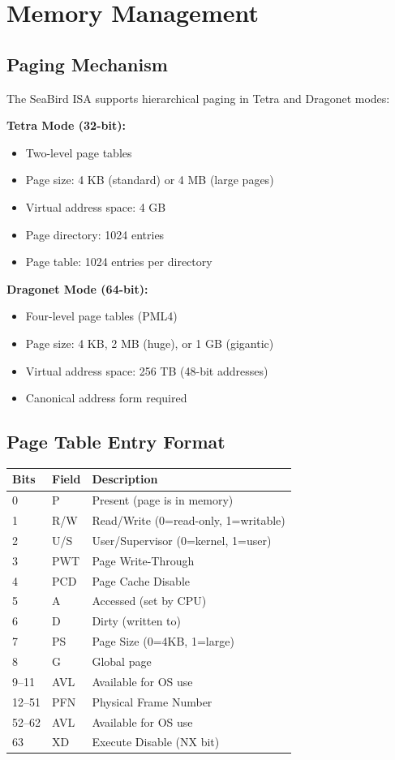 \documentclass[12pt]{article}
\begin{document}
\section{Memory Management}

\subsection{Paging Mechanism}

The SeaBird ISA supports hierarchical paging in Tetra and Dragonet modes:

\textbf{Tetra Mode (32-bit):}
\begin{itemize}
    \item Two-level page tables
    \item Page size: 4 KB (standard) or 4 MB (large pages)
    \item Virtual address space: 4 GB
    \item Page directory: 1024 entries
    \item Page table: 1024 entries per directory
\end{itemize}

\textbf{Dragonet Mode (64-bit):}
\begin{itemize}
    \item Four-level page tables (PML4)
    \item Page size: 4 KB, 2 MB (huge), or 1 GB (gigantic)
    \item Virtual address space: 256 TB (48-bit addresses)
    \item Canonical address form required
\end{itemize}

\subsection{Page Table Entry Format}

\begin{table}[h]
\centering
\begin{tabular}{@{}lll@{}}
\toprule
\textbf{Bits} & \textbf{Field} & \textbf{Description} \\ \midrule
0 & P & Present (page is in memory) \\
1 & R/W & Read/Write (0=read-only, 1=writable) \\
2 & U/S & User/Supervisor (0=kernel, 1=user) \\
3 & PWT & Page Write-Through \\
4 & PCD & Page Cache Disable \\
5 & A & Accessed (set by CPU) \\
6 & D & Dirty (written to) \\
7 & PS & Page Size (0=4KB, 1=large) \\
8 & G & Global page \\
9--11 & AVL & Available for OS use \\
12--51 & PFN & Physical Frame Number \\
52--62 & AVL & Available for OS use \\
63 & XD & Execute Disable (NX bit) \\ \bottomrule
\end{tabular}
\end{table}
\end{document}

